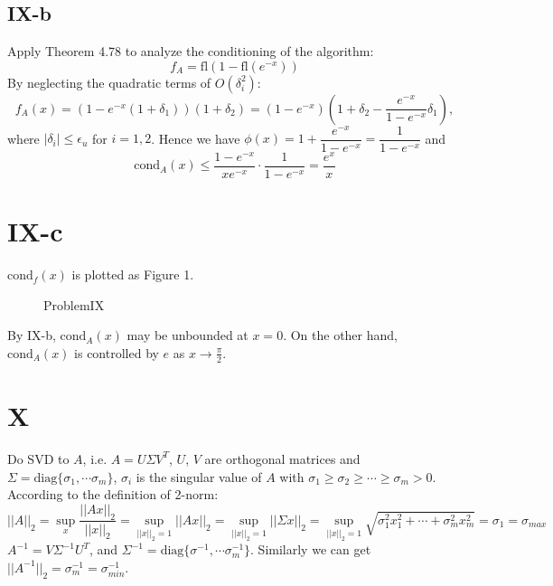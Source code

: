 \documentclass[a4paper]{article}
\begin{document}
\subsection*{IX-b}
Apply Theorem 4.78 to analyze the conditioning of the algorithm:
$$
f_A = \text{fl}(1-\text{fl}(e^{-x}))
$$
By neglecting the quadratic terms of $O(\delta_i^2)$:
$$
f_A(x) = (1-e^{-x}(1+\delta_1))(1+\delta_2) = (1-e^{-x})(1+\delta_2-\frac{e^{-x}}{1-e^{-x}}\delta_1),
$$
where $|\delta_i| \leq \epsilon_u$ for $i = 1,2$. Hence we have $\phi(x) = 1 + \dfrac{e^{-x}}{1-e^{-x}} = \dfrac{1}{1-e^{-x}}$ and
$$
\text{cond}_A(x) \leq \frac{1-e^{-x}}{xe^{-x}}\cdot\dfrac{1}{1-e^{-x}} = \frac{e^x}{x}
$$
\section*{IX-c}
$\text{cond}_f(x)$ is plotted as Figure 1.
\begin{figure}[htbp]
  \centering
  \caption{ProblemIX}
\end{figure}

By IX-b, $\text{cond}_A(x)$ may be unbounded at $x = 0$. On the other hand, $\text{cond}_A(x)$ is controlled by $e$ as $x\rightarrow\frac{\pi}{2}$.

\section*{X}
Do SVD to $A$, i.e. $A = U\Sigma V^T$, $U$, $V$ are orthogonal matrices and $\Sigma = \text{diag}\{\sigma_1,\cdots\sigma_m\}$, $\sigma_i$ is the singular value of $A$ with $\sigma_1 \geq \sigma_2 \geq \cdots \geq \sigma_m > 0$.
According to the definition of 2-norm:
$$
||A||_2 = \sup\limits_{x}\frac{||Ax||_2}{||x||_2} = \sup\limits_{||x||_2=1}||Ax||_2=\sup\limits_{||x||_2=1}||\Sigma x||_2
= \sup\limits_{||x||_2=1}\sqrt{\sigma_1^2 x_1^2 + \cdots + \sigma_m^2 x_m^2} = \sigma_1 = \sigma_{max}
$$
$A^{-1} = V\Sigma^{-1}U^T$, and $\Sigma^{-1} = \text{diag}\{\sigma^{-1},\cdots\sigma_m^{-1}\}$. Similarly we can get $||A^{-1}||_2 = \sigma_m^{-1} = \sigma_{min}^{-1}$.
\end{document}
